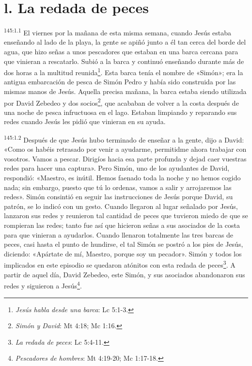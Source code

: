 \section*{l. La redada de peces}
\par 
\textsuperscript{145:1.1} El viernes por la mañana de esta misma semana, cuando Jesús estaba enseñando al lado de la playa, la gente se apiñó junto a él tan cerca del borde del agua, que hizo señas a unos pescadores que estaban en una barca cercana para que vinieran a rescatarlo. Subió a la barca y continuó enseñando durante más de dos horas a la multitud reunida\footnote{\textit{Jesús habla desde una barca}: Lc 5:1-3.}. Esta barca tenía el nombre de «Simón»; era la antigua embarcación de pesca de Simón Pedro y había sido construida por las mismas manos de Jesús. Aquella precisa mañana, la barca estaba siendo utilizada por David Zebedeo y dos socios\footnote{\textit{Simón y David}: Mt 4:18; Mc 1:16.}, que acababan de volver a la costa después de una noche de pesca infructuosa en el lago. Estaban limpiando y reparando sus redes cuando Jesús les pidió que vinieran en su ayuda.

\par 
\textsuperscript{145:1.2} Después de que Jesús hubo terminado de enseñar a la gente, dijo a David: «Como os habéis retrasado por venir a ayudarme, permitidme ahora trabajar con vosotros. Vamos a pescar. Dirigíos hacia esa parte profunda y dejad caer vuestras redes para hacer una captura». Pero Simón, uno de los ayudantes de David, respondió: «Maestro, es inútil. Hemos faenado toda la noche y no hemos cogido nada; sin embargo, puesto que tú lo ordenas, vamos a salir y arrojaremos las redes». Simón consintió en seguir las instrucciones de Jesús porque David, su patrón, se lo indicó con un gesto. Cuando llegaron al lugar señalado por Jesús, lanzaron sus redes y reunieron tal cantidad de peces que tuvieron miedo de que se rompieran las redes; tanto fue así que hicieron señas a sus asociados de la costa para que vinieran a ayudarlos. Cuando llenaron totalmente las tres barcas de peces, casi hasta el punto de hundirse, el tal Simón se postró a los pies de Jesús, diciendo: «Apártate de mí, Maestro, porque soy un pecador». Simón y todos los implicados en este episodio se quedaron atónitos con esta redada de peces\footnote{\textit{La redada de peces}: Lc 5:4-11.}. A partir de aquel día, David Zebedeo, este Simón, y sus asociados abandonaron sus redes y siguieron a Jesús\footnote{\textit{Pescadores de hombres}: Mt 4:19-20; Mc 1:17-18.}.

